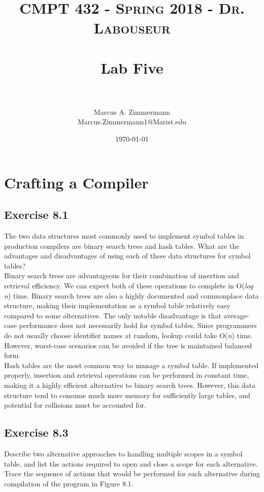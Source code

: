 \documentclass[letterpaper, 10pt,DIV=13]{scrartcl}
\title{	
   \normalfont \normalsize
   \textsc{CMPT 432 - Spring 2018 - Dr. Labouseur} \\[10pt] %
   \horrule{0.5pt} \\[0.25cm] 	%
   \huge Lab Five  \\     	    %
   \horrule{0.5pt} \\[0.25cm] 	%
}
\author{Marcus A. Zimmermann \\ \normalsize Marcus.Zimmermann1@Marist.edu}
\date{\normalsize\today} 	%
\numberwithin{equation}{section} %
\numberwithin{figure}{section} %
\numberwithin{table}{section} %
\begin{document}
\maketitle %

\section*{Crafting a Compiler}
\subsection*{Exercise 8.1}
The two data structures most commonly used to implement symbol tables in production compilers are binary search trees and hash tables. What are the advantages and disadvantages of using each of these data structures for symbol tables? \\

Binary search trees are advantageous for their combination of insertion and retrieval efficiency. We can expect both of these operations to complete in O(\textit{log n}) time. Binary search trees are also a highly documented and commonplace data structure, making their implementation as a symbol table relatively easy compared to some alternatives. The only notable disadvantage is that average-case performance does not necessarily hold for symbol tables. Since programmers do not usually choose identifier names at random, lookup could take O(\textit{n}) time. However, worst-case scenarios can be avoided if the tree is maintained balanced form.\\

Hash tables are the most common way to manage a symbol table. If implemented properly, insertion and retrieval operations can be performed in constant time, making it a highly efficient alternative to binary search trees. However, this data structure tend to consume much more memory for sufficiently large tables, and potential for collisions must be accounted for.

\pagebreak

\subsection*{Exercise 8.3}
Describe two alternative approaches to handling multiple scopes in a symbol table, and list the actions required to open and close a scope for each alternative. Trace the sequence of actions that would be performed for each alternative during compilation of the program in Figure 8.1. \\
\end{document}
